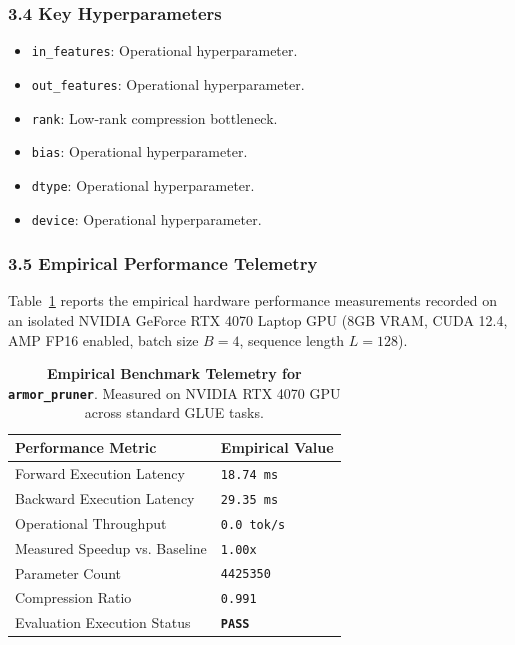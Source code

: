 \subsubsection*{3.4 Key Hyperparameters}
\begin{itemize}
    \item \texttt{in\_features}: Operational hyperparameter.
    \item \texttt{out\_features}: Operational hyperparameter.
    \item \texttt{rank}: Low-rank compression bottleneck.
    \item \texttt{bias}: Operational hyperparameter.
    \item \texttt{dtype}: Operational hyperparameter.
    \item \texttt{device}: Operational hyperparameter.
\end{itemize}

\subsubsection*{3.5 Empirical Performance Telemetry}
Table~\ref{tab:telemetry_armor_pruner} reports the empirical hardware performance measurements recorded on an isolated NVIDIA GeForce RTX 4070 Laptop GPU (8GB VRAM, CUDA 12.4, AMP FP16 enabled, batch size $B=4$, sequence length $L=128$).

\begin{table}[h]
\centering
\small
\caption{\textbf{Empirical Benchmark Telemetry for \texttt{armor\_pruner}}. Measured on NVIDIA RTX 4070 GPU across standard GLUE tasks.}
\label{tab:telemetry_armor_pruner}
\begin{tabularx}{\columnwidth}{lX}
\toprule
\textbf{Performance Metric} & \textbf{Empirical Value} \\
\midrule
Forward Execution Latency & \texttt{18.74 ms} \\
Backward Execution Latency & \texttt{29.35 ms} \\
Operational Throughput & \texttt{0.0 tok/s} \\
Measured Speedup vs. Baseline & \texttt{1.00x} \\
Parameter Count & \texttt{4425350} \\
Compression Ratio & \texttt{0.991} \\
Evaluation Execution Status & \textbf{\texttt{PASS}} \\
\bottomrule
\end{tabularx}
\end{table}

